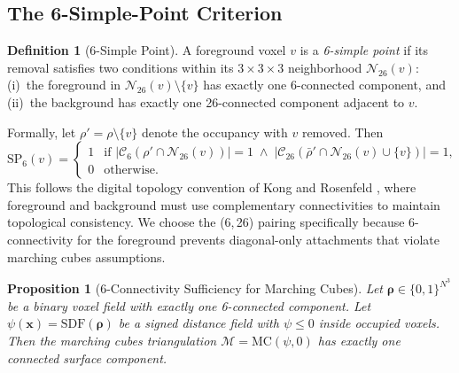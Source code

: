 \documentclass[11pt]{article}
\theoremstyle{plain}
\newtheorem{proposition}[theorem]{Proposition}
\theoremstyle{definition}
\newtheorem{definition}[theorem]{Definition}
\theoremstyle{remark}
\begin{document}
\subsection{The 6-Simple-Point Criterion}
\label{sec:simplepoint}

\begin{definition}[6-Simple Point]\label{def:simplepoint}
A foreground voxel $v$ is a \emph{6-simple point} if its removal satisfies two conditions within its $3\times3\times3$ neighborhood $\mathcal{N}_{26}(v)$: (i)~the foreground in $\mathcal{N}_{26}(v) \setminus \{v\}$ has exactly one 6-connected component, and (ii)~the background has exactly one 26-connected component adjacent to $v$.
\end{definition}

Formally, let $\rho' = \rho \setminus \{v\}$ denote the occupancy with $v$ removed. Then
\begin{equation}\label{eq:simplepoint}
\mathrm{SP}_6(v) =
\begin{cases}
1 & \text{if } |\mathcal{C}_6(\rho' \cap \mathcal{N}_{26}(v))| = 1 \;\land\; |\mathcal{C}_{26}(\bar{\rho}' \cap \mathcal{N}_{26}(v) \cup \{v\})| = 1, \\
0 & \text{otherwise}.
\end{cases}
\end{equation}
This follows the digital topology convention of Kong and Rosenfeld \cite{kong1989}, where foreground and background must use complementary connectivities to maintain topological consistency. We choose the (6,\,26) pairing specifically because 6-connectivity for the foreground prevents diagonal-only attachments that violate marching cubes assumptions.

\begin{proposition}[6-Connectivity Sufficiency for Marching Cubes]\label{prop:mc}
Let $\boldsymbol{\rho} \in \{0,1\}^{N^3}$ be a binary voxel field with exactly one 6-connected component. Let $\psi(\mathbf{x}) = \mathrm{SDF}(\boldsymbol{\rho})$ be a signed distance field with $\psi \leq 0$ inside occupied voxels. Then the marching cubes triangulation $\mathcal{M} = \mathrm{MC}(\psi, 0)$ has exactly one connected surface component.
\end{proposition}
\end{document}
